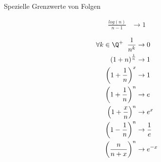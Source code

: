 \begin{highlight}{Spezielle Grenzwerte von Folgen}
\begin{center}
\begin{minipage}{0.3\linewidth}
\begin{align*}
                \frac{log(n)}{n - 1} &\to 1
            \end{align*}
        \end{minipage}
        \hfill\vline\hfill
        \begin{minipage}{0.3\linewidth}
            \begin{align*}
                \forall k \in \Q^+ \hspace{2mm}\frac{1}{n^k} &\to 0\\
                \left(1 + n\right)^{\frac{1}{n}} &\to 1\\
                \left(1 + \frac{1}{n}\right)^x &\to 1\\
                \left(1 + \frac{1}{n}\right)^n &\to e\\
                \left(1 + \frac{x}{n}\right)^n &\to e^x\\
                \left(1 - \frac{1}{n}\right)^n &\to \frac{1}{e}\\
                \left(\frac{n}{n + x}\right)^n &\to e^{-x}
            \end{align*}
        \end{minipage}
    \end{center}
    \begin{comment}
    \tcbsubtitle{$n \to 0$}
     \begin{minipage}{0.3\linewidth}
        \begin{align*}
            \ln n &\to -\infty\\
            \frac{ln(n+1)}{n} &\to 1\\
            n \log n &\to 0\\
            \frac{\log 1 - n}{n} &\to -1\\
            \frac{\log 1 - n}{n} &\to -1\\
            \forall x>0 \hspace{1mm}\frac{x^n-1}{n} &\to \ln(x)
        \end{align*}
    \end{minipage}
    \hfill\vline\hfill
    \begin{minipage}{0.3\linewidth}
        \begin{align*}
            \frac{\sin n}{n} &\to 1\\
            \frac{\cos n - 1}{n} &\to 0\\
            \frac{1}{\cos n} &\to 1\\

\end{comment}
\end{highlight}
